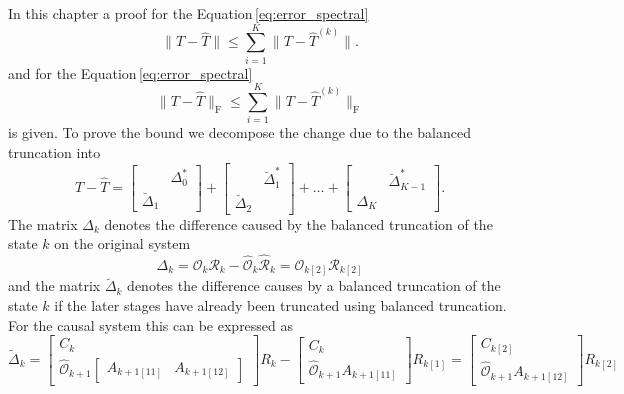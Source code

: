\documentclass[doctype=mastersthesis,BCOR=15mm,biblatex]{ldvbook}%
\newcommand{\R}{\mathcal{R}} %
\newcommand{\Ob}{\mathcal{O}} %
\begin{document}
In this chapter a proof for the Equation\,\ref{eq:error_spectral}
\begin{equation}
\|T-\hat{T}\| \leq \sum_{i=1}^K \|T-\hat{T}^{(k)}\| .
\end{equation}
and for the Equation\,\ref{eq:error_spectral}
\begin{equation}
\|T-\hat{T}\|_\text{F} \leq \sum_{i=1}^K \|T-\hat{T}^{(k)}\|_\text{F}
\end{equation}
is given.
To prove the bound we decompose the change due to the balanced truncation into
\begin{equation}\label{eq:decomposition_approx_sum}
	T-\hat{T} =
	\begin{bmatrix}
	&\Delta_0^*\\
	\breve{\Delta}_1
	\end{bmatrix}
	+
	\begin{bmatrix}
	&\breve{\Delta}_1^*\\
	\breve{\Delta}_2
	\end{bmatrix}
	+\dots+
	\begin{bmatrix}
	&\breve{\Delta}_{K-1}^*\\
	\Delta_K
	\end{bmatrix}
	.
\end{equation}
The matrix $\Delta_k$ denotes the difference caused by the balanced truncation of the state $k$ on the original system
\begin{equation}
	\Delta_k = \Ob_{k}\R_{k} - \hat{\Ob}_k\hat{\R}_k = \Ob_{k[2]}\R_{k[2]}
\end{equation}
and the matrix $\breve{\Delta}_k$ denotes the difference causes by a balanced truncation of the state $k$ if the later stages have already been truncated using balanced truncation. 
For the causal system this can be expressed as 
\begin{equation*}
\tilde{\Delta}_k=
	\begin{bmatrix}
	C_k\\
	\hat{\Ob}_{k+1}\begin{bmatrix}
	A_{k+1[11]}&A_{k+1[12]}
	\end{bmatrix}
	\end{bmatrix}
	R_k
	-
	\begin{bmatrix}
C_k\\
\hat{\Ob}_{k+1}
A_{k+1[11]}
\end{bmatrix}
R_{k[1]}
= 
\begin{bmatrix}
C_{k[2]}\\
\hat{\Ob}_{k+1}A_{k+1[12]}
\end{bmatrix}
R_{k[2]}
\end{equation*}
\end{document}
